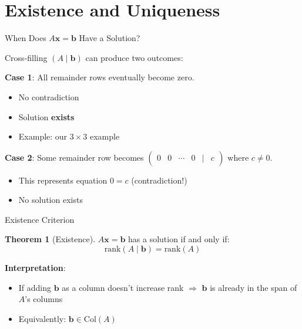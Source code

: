 \documentclass[10pt]{beamer}
\theoremstyle{definition}
\newtheorem{thm}{Theorem}[section]
\newcommand{\x}[1]{\alert{\textbf{#1}}}
\begin{document}
\section{Existence and Uniqueness}

\begin{frame}{When Does $A\mathbf{x} = \mathbf{b}$ Have a Solution?}

Cross-filling $(A \mid \mathbf{b})$ can produce two outcomes:

\vspace{1em}

\x{Case 1}: All remainder rows eventually become zero.
\begin{itemize}
\item No contradiction
\item Solution \x{exists}
\item Example: our $3 \times 3$ example
\end{itemize}

\vspace{1em}

\x{Case 2}: Some remainder row becomes $\begin{pmatrix} 0 & 0 & \cdots & 0 & | & c \end{pmatrix}$ where $c \neq 0$.
\begin{itemize}
\item This represents equation $0 = c$ (contradiction!)
\item No solution exists
\end{itemize}

\end{frame}

\begin{frame}{Existence Criterion}

\begin{thm}[Existence]
$A\mathbf{x} = \mathbf{b}$ has a solution if and only if:
$$\text{rank}(A \mid \mathbf{b}) = \text{rank}(A)$$
\end{thm}

\vspace{1em}

\x{Interpretation}:
\begin{itemize}
\item If adding $\mathbf{b}$ as a column doesn't increase rank $\Rightarrow$ $\mathbf{b}$ is already in the span of $A$'s columns
\item Equivalently: $\mathbf{b} \in \text{Col}(A)$
\end{itemize}

\end{frame}
\end{document}
